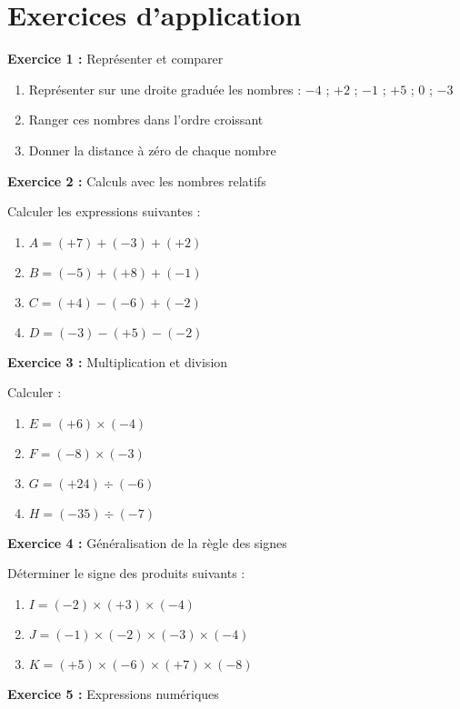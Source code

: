 \section{Exercices d'application}

\begin{exercisebox}
\textbf{Exercice 1 :} Représenter et comparer

\begin{enumerate}[label=\alph*)]
\item Représenter sur une droite graduée les nombres : $-4$ ; $+2$ ; $-1$ ; $+5$ ; $0$ ; $-3$
\item Ranger ces nombres dans l'ordre croissant
\item Donner la distance à zéro de chaque nombre
\end{enumerate}

\textbf{Exercice 2 :} Calculs avec les nombres relatifs

Calculer les expressions suivantes :
\begin{enumerate}[label=\alph*)]
	\item $A = (+7) + (-3) + (+2)$
	\item $B = (-5) + (+8) + (-1)$
	\item $C = (+4) - (-6) + (-2)$
	\item $D = (-3) - (+5) - (-2)$
\end{enumerate}

\textbf{Exercice 3 :} Multiplication et division

Calculer :
\begin{enumerate}[label=\alph*)]
	\item $E = (+6) \times (-4)$
	\item $F = (-8) \times (-3)$
	\item $G = (+24) \div (-6)$
	\item $H = (-35) \div (-7)$
\end{enumerate}

\textbf{Exercice 4 :} Généralisation de la règle des signes

Déterminer le signe des produits suivants :
\begin{enumerate}[label=\alph*)]
	\item $I = (-2) \times (+3) \times (-4)$
	\item $J = (-1) \times (-2) \times (-3) \times (-4)$
	\item $K = (+5) \times (-6) \times (+7) \times (-8)$
\end{enumerate}

\textbf{Exercice 5 :} Expressions numériques


\end{exercisebox}
